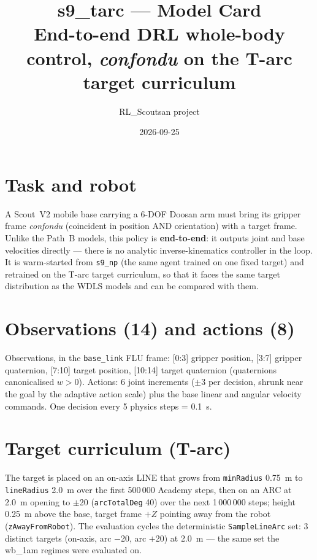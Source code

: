 \documentclass[11pt]{article}
\title{\vspace{-1.5em}s9\_tarc --- Model Card\\[2pt]\large End-to-end DRL whole-body control, \emph{confondu} on the T-arc target curriculum}
\author{RL\_Scoutsan project}\date{2026-09-25}
\newcommand{\code}[1]{\texttt{#1}}
\begin{document}
\maketitle\vspace{-1em}
\section{Task and robot}
A Scout~V2 mobile base carrying a 6-DOF Doosan arm must bring its gripper frame \emph{confondu} (coincident in position AND orientation) with a target frame. Unlike the Path~B models, this policy is \textbf{end-to-end}: it outputs joint and base velocities directly --- there is no analytic inverse-kinematics controller in the loop. It is warm-started from \code{s9\_np} (the same agent trained on one fixed target) and retrained on the T-arc target curriculum, so that it faces the same target distribution as the WDLS models and can be compared with them.
\section{Observations (14) and actions (8)}
Observations, in the \code{base\_link} FLU frame: [0:3] gripper position, [3:7] gripper quaternion, [7:10] target position, [10:14] target quaternion (quaternions canonicalised $w>0$). Actions: 6 joint increments ($\pm$3\textdegree{} per decision, shrunk near the goal by the adaptive action scale) plus the base linear and angular velocity commands. One decision every 5 physics steps = 0.1~s.
\section{Target curriculum (T-arc)}
The target is placed on an on-axis LINE that grows from \code{minRadius} 0.75~m to \code{lineRadius} 2.0~m over the first 500\,000 Academy steps, then on an ARC at 2.0~m opening to $\pm$20\textdegree{} (\code{arcTotalDeg} 40) over the next 1\,000\,000 steps; height 0.25~m above the base, target frame $+Z$ pointing away from the robot (\code{zAwayFromRobot}). The evaluation cycles the deterministic \code{SampleLineArc} set: 3 distinct targets (on-axis, arc $-$20\textdegree, arc $+$20\textdegree) at 2.0~m --- the same set the wb\_1am regimes were evaluated on.
\end{document}
